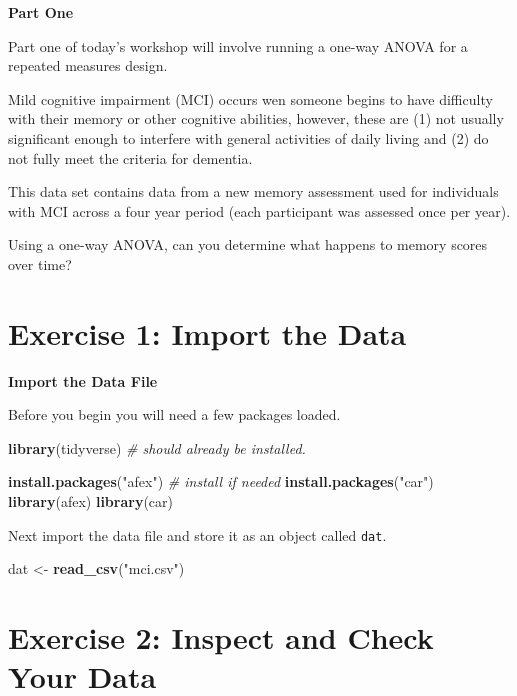\documentclass[
]{book}
\newenvironment{Shaded}{\begin{snugshade}}{\end{snugshade}}
\newcommand{\CommentTok}[1]{\textcolor[rgb]{0.56,0.35,0.01}{\textit{#1}}}
\newcommand{\FunctionTok}[1]{\textcolor[rgb]{0.13,0.29,0.53}{\textbf{#1}}}
\newcommand{\NormalTok}[1]{#1}
\newcommand{\OtherTok}[1]{\textcolor[rgb]{0.56,0.35,0.01}{#1}}
\newcommand{\StringTok}[1]{\textcolor[rgb]{0.31,0.60,0.02}{#1}}
\let\oldsection\section
\renewcommand{\section}{\needspace{5\baselineskip}\oldsection}
\begin{document}
\textbf{Part One}

Part one of today's workshop will involve running a one-way ANOVA for a repeated measures design.

Mild cognitive impairment (MCI) occurs wen someone begins to have difficulty with their memory or other cognitive abilities, however, these are (1) not usually significant enough to interfere with general activities of daily living and (2) do not fully meet the criteria for dementia.

This data set contains data from a new memory assessment used for individuals with MCI across a four year period (each participant was assessed once per year).

Using a one-way ANOVA, can you determine what happens to memory scores over time?

\section{Exercise 1: Import the Data}\label{exercise-1-import-the-data-3}

\textbf{Import the Data File}

Before you begin you will need a few packages loaded.

\begin{Shaded}
\begin{Highlighting}[]
\FunctionTok{library}\NormalTok{(tidyverse) }\CommentTok{\# should already be installed.}

\FunctionTok{install.packages}\NormalTok{(}\StringTok{"afex"}\NormalTok{) }\CommentTok{\# install if needed}
\FunctionTok{install.packages}\NormalTok{(}\StringTok{"car"}\NormalTok{)}
\FunctionTok{library}\NormalTok{(afex)}
\FunctionTok{library}\NormalTok{(car)}
\end{Highlighting}
\end{Shaded}

Next import the data file and store it as an object called \texttt{dat}.

\begin{Shaded}
\begin{Highlighting}[]
\NormalTok{dat }\OtherTok{\textless{}{-}} \FunctionTok{read\_csv}\NormalTok{(}\StringTok{"mci.csv"}\NormalTok{)}
\end{Highlighting}
\end{Shaded}

\section{Exercise 2: Inspect and Check Your Data}\label{exercise-2-inspect-and-check-your-data-3}
\end{document}
